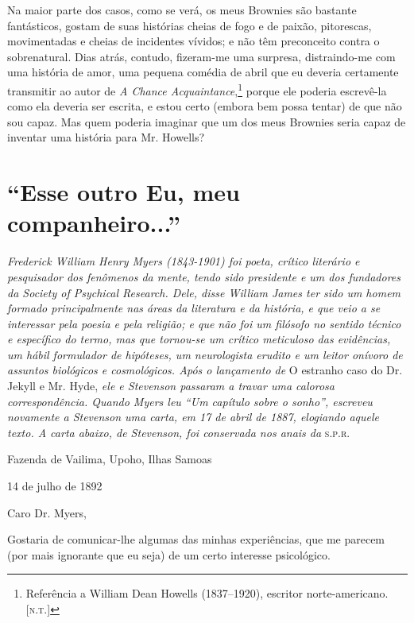Na maior parte dos casos, como se verá, os meus Brownies são bastante
fantásticos, gostam de suas histórias cheias de fogo e de paixão,
pitorescas, movimentadas e cheias de incidentes vívidos; e não têm
preconceito contra o sobrenatural.  Dias atrás, contudo, fizeram-me uma
surpresa, distraindo-me com uma história de amor, uma pequena comédia
de abril que eu deveria certamente transmitir ao autor de \textit{A
Chance Acquaintance},\footnote{Referência a William Dean 
Howells (1837--1920), escritor norte-americano. [\textsc{n.t.}]} porque ele poderia escrevê-la como ela deveria
ser escrita, e estou certo (embora bem possa tentar) de que não sou
capaz.  Mas quem poderia imaginar que um dos meus Brownies seria capaz
de inventar uma história para Mr. Howells?

\chapter[Esse outro Eu, meu companheiro... --- R.L.~Stevenson]{“Esse outro Eu, meu companheiro...”}

\textit{Frederick William Henry Myers (1843-1901) foi poeta, crítico
literário e pesquisador dos fenômenos da mente, tendo sido presidente e
um dos fundadores da Society of Psychical Research.  Dele, disse
William James ter sido um homem formado principalmente nas áreas da
literatura e da história, e que veio a se interessar pela poesia e pela
religião; e que não foi um filósofo no sentido técnico e específico do
termo, mas que tornou-se um crítico meticuloso das evidências, um hábil
formulador de hipóteses, um neurologista erudito e um leitor onívoro de
assuntos biológicos e cosmológicos.  Após o lançamento de}
O estranho caso do Dr. Jekyll e Mr. Hyde, \textit{ele e Stevenson passaram a travar
uma calorosa correspondência.  Quando Myers leu ``Um capítulo
sobre o sonho'', escreveu novamente a Stevenson uma carta, em 17
de abril de 1887, elogiando aquele texto.  A carta abaixo, de
Stevenson, foi conservada nos anais da} \textsc{s.p.r.}

\clearpage

Fazenda de Vailima, Upoho, Ilhas Samoas

14 de julho de 1892 


\bigskip

Caro Dr. Myers,

Gostaria de comunicar-lhe algumas das minhas experiências, que me
parecem (por mais ignorante que eu seja) de um certo interesse
psicológico.


